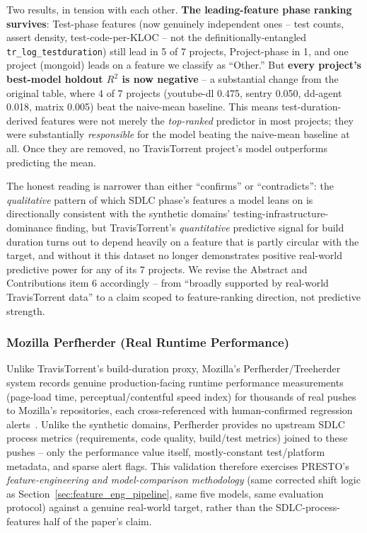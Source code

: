 \documentclass[technologies,article,submit,pdftex,moreauthors]{Definitions/mdpi}
\begin{document}
Two results, in tension with each other. \textbf{The leading-feature
phase ranking survives}: Test-phase features (now genuinely independent
ones -- test counts, assert density, test-code-per-KLOC -- not the
definitionally-entangled \texttt{tr\_\allowbreak log\_\allowbreak testduration}) still lead in 5
of 7 projects, Project-phase in 1, and one project (mongoid) leads on a
feature we classify as ``Other.'' But \textbf{every project's
best-model holdout \(R^2\) is now negative} -- a substantial change from
the original table, where 4 of 7 projects (youtube-dl 0.475, sentry
0.050, dd-agent 0.018, matrix 0.005) beat the naive-mean baseline. This
means test-duration-derived features were not merely the
\emph{top-ranked} predictor in most projects; they were substantially
\emph{responsible} for the model beating the naive-mean baseline at
all. Once they are removed, no TravisTorrent project's model
outperforms predicting the mean.

The honest reading is narrower than either ``confirms'' or
``contradicts'': the \emph{qualitative} pattern of which SDLC phase's
features a model leans on is directionally consistent with the
synthetic domains' testing-infrastructure-dominance finding, but
TravisTorrent's \emph{quantitative} predictive signal for build
duration turns out to depend heavily on a feature that is partly
circular with the target, and without it this dataset no longer
demonstrates positive real-world predictive power for any of its 7
projects. We revise the Abstract and Contributions item 6 accordingly
-- from ``broadly supported by real-world TravisTorrent data'' to a
claim scoped to feature-ranking direction, not predictive strength.

\subsubsection{Mozilla Perfherder (Real Runtime
Performance)}\label{sec:perfherder}

Unlike TravisTorrent's build-duration proxy, Mozilla's
Perfherder/Treeherder system records genuine production-facing runtime
performance measurements (page-load time, perceptual/contentful speed
index) for thousands of real pushes to Mozilla's repositories, each
cross-referenced with human-confirmed regression alerts~\cite{perfherder2025}. Unlike the synthetic
domains, Perfherder provides no upstream SDLC process metrics
(requirements, code quality, build/test metrics) joined to these pushes
-- only the performance value itself, mostly-constant test/platform
metadata, and sparse alert flags. This validation therefore exercises
PRESTO's \emph{feature-engineering and model-comparison methodology}
(same corrected shift logic as Section~\ref{sec:feature_eng_pipeline}, same five models, same
evaluation protocol) against a genuine real-world target, rather than
the SDLC-process-features half of the paper's claim.
\end{document}
